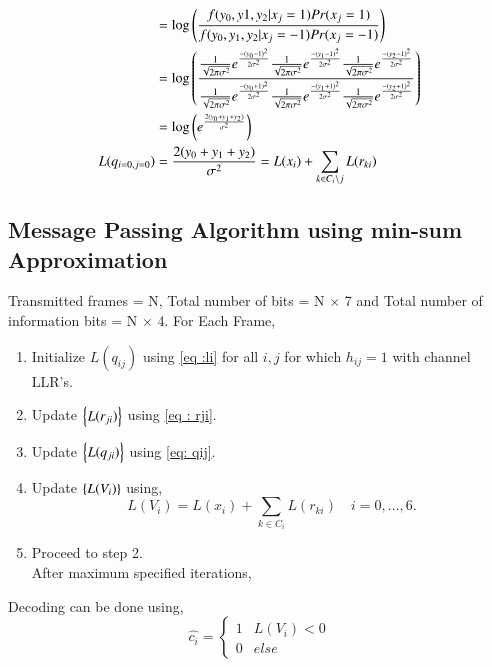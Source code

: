 \documentclass[journal,12pt,twocolumn]{IEEEtran}
\begin{document}
\begin{enumerate}
\begin{align}
&= \log \left(\frac{f(y_0,y1,y_2|x_j=1)Pr(x_j=1)}{f(y_0,y_1,y_2|x_j=-1)Pr(x_j=-1)}\right) \\
&= \log \left(\frac{\frac{1}{\sqrt{2\pi\sigma^2}}e^{\frac{-(y_0-1)^2}{2\sigma^2}}\frac{1}{\sqrt{2\pi\sigma^2}}e^{\frac{-(y_1-1)^2}{2\sigma^2}}\frac{1}{\sqrt{2\pi\sigma^2}}e^{\frac{-(y_2-1)^2}{2\sigma^2}}}{\frac{1}{\sqrt{2\pi\sigma^2}}e ^{\frac{-(y_0+1)^2}{2\sigma^2}}\frac{1}{\sqrt{2\pi\sigma^2}}e ^{\frac{-(y_1+1)^2}{2\sigma^2}}\frac{1}{\sqrt{2\pi\sigma^2}}e ^{\frac{-(y_2+1)^2}{2\sigma^2}} }  \right) \\
&=\log \left(e^{\frac{2(y_0+y_1+y_2)}{\sigma^2}}\right) \\
L(q_{i=0,j=0})&= \frac{2(y_0+y_1+y_2)}{\sigma^2}=L(x_i)+\sum_{k \in C_i\setminus j} L(r_{ki}) \label{eq: qij}
\end{align}
\end{enumerate}

\subsection{Message Passing Algorithm using min-sum Approximation}
Transmitted frames = N, Total number of bits = N $\times$ 7 and Total number of information bits = N $\times$ 4.
For Each Frame,
\begin{enumerate}
\item Initialize $L(q_{ij})$ using \eqref{eq :li} for all $i,j$ for which $h_{ij}=1$ with channel LLR's.
\item Update $\left\{L(r_{ji})\right\}$ using \eqref{eq : rji}.
\item Update $\left\{L(q_{ji})\right\}$ using \eqref{eq: qij}.
\item Update $\left\{L(V_i)\right\}$ using,
\begin{equation}
L(V_i)=L(x_i)+\sum_{k \in C_i} L(r_{ki}) \quad i=0,\dots,6.
\end{equation}
\item Proceed to step 2.\\
After maximum specified iterations,

\end{enumerate}
Decoding can be done using,
\begin{equation}
\hat{c_i} = \begin{cases}
1 & L(V_i) < 0\\
0 & else
\end{cases}
\end{equation}
%
\end{document}
